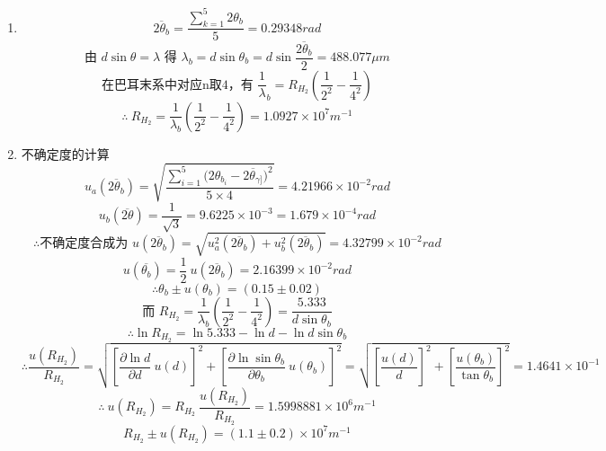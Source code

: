 \documentclass[11pt,a4paper,oneside]{article}
\begin{document}
\begin{enumerate}
  \item { }
      $$\overline{2{\theta}_b} = \displaystyle\frac{\sum_{k=1}^5 2{\theta}_b}{5} = 0.29348rad$$
      $$\displaystyle\text{由\ }d\sin{\theta} = {\lambda}\text{\ 得\ }{\lambda}_b = d\sin{\theta}_b = d\sin{\frac{\overline{2{\theta}_b}}{2}} = 488.077\mu m $$
      $$\displaystyle\text{在巴耳末系中对应n取4，有\ }\frac{1}{\lambda}_b = R_{H_2}\left(\frac{1}{2^2}-\frac{1}{4^2}\right)$$
      $$\therefore\ \displaystyle R_{H_2} = \frac{1}{ {\lambda}_b}\left(\frac{1}{2^2}-\frac{1}{4^2}\right) = 1.0927{\times}10^{7}m^{-1}$$
  \item {不确定度的计算}
      $$u_a(\overline{2{\theta}_b}) = \displaystyle\sqrt{\frac{\sum_{i=1}^5{(2{\theta}_{b_{i}}-\overline{2{\theta}_{\gamma]}}})^2}{5\times4}}=4.21966{\times}10^{-2}rad$$
      $$u_b(\overline{2\theta}) = \displaystyle\frac{1}{\sqrt3} = 9.6225\times10^{-3} = 1.679 \times 10^{-4} rad$$
      $$\therefore\text{不确定度合成为\ }u(\overline{2{\theta}_b}) = \sqrt{u_a^2(\overline{2{\theta}_b})+u_b^2(\overline{2{\theta}_b})} = 4.32799{\times}10^{-2}rad$$
      $$u(\overline{ {\theta}_b})= \displaystyle\frac12\ u(\overline{2{\theta}_b}) = 2.16399{\times}10^{-2}rad$$
      $$\therefore{\theta}_b \pm u({\theta}_b) = (0.15\pm0.02)$$
      $$\text{而\ }\displaystyle R_{H_2} = \frac{1}{ {\lambda}_b}\left(\frac{1}{2^2}-\frac{1}{4^2}\right) = \frac{5.333}{d\sin{\theta}_b}$$
      $$\therefore\ln{R_{H_2}} = \ln{5.333} -\ln{d} - \ln{d\sin{\theta}_b}$$
      $$\therefore\displaystyle \frac{u(R_{H_2})}{R_{H_2}} = \sqrt{ {\left[\frac{\partial{\ln{d}}}{\partial{d}}\ u(d)\right]}^2 + {\left[\frac{\partial{\ln{\sin{ {\theta}_b}}}}{\partial{ {\theta}_b}}\ u({\theta}_b)\right]}^2} = \sqrt{ {\left[\frac{u(d)}{d}\right]}^2 + {\left[\frac{u({\theta}_b)}{\tan{ {\theta}_b}}\right]}^2} = 1.4641{\times}10^{-1}$$
      $$\therefore \ u(R_{H_2}) = \displaystyle R_{H_2}\ \frac{u(R_{H_2})}{R_{H_2}} = 1.5998881{\times}10^{6}m^{-1}$$ 
      $$R_{H_2} \pm u(R_{H_2}) = (1.1\pm0.2){\times}10^{7}m^{-1}$$
\end{enumerate}
\end{document}

